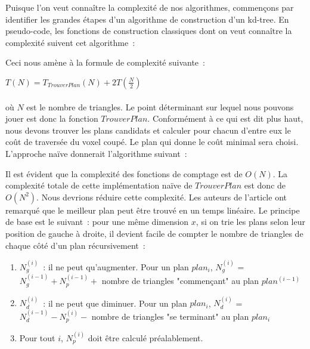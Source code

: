 \documentclass[a4paper]{article}
\begin{document}
Puisque l'on veut connaître la complexité de nos algorithmes, commençons par identifier les grandes étapes d'un algorithme de construction d'un kd-tree. En pseudo-code, les fonctions de construction classiques dont on veut connaître la complexité suivent cet algorithme~:
\begin{function}
\end{function}

Ceci nous amène à la formule de complexité suivante~:

$T(N) = T_{TrouverPlan}(N) + 2T(\frac{N}{2})$
\\\\
où $N$ est le nombre de triangles. Le point déterminant sur lequel nous pouvons jouer est donc la fonction $TrouverPlan$. Conformément à ce qui est dit plus haut, nous devons trouver les plans candidats et calculer pour chacun d'entre eux le coût de traversée du voxel coupé. Le plan qui donne le coût minimal sera choisi. L'approche naïve donnerait l'algorithme suivant~:

\begin{algorithm}
\end{algorithm}

Il est évident que la complexité des fonctions de comptage est de $O(N)$. La complexité totale de cette implémentation naïve de $TrouverPlan$ est donc de $O(N^2)$. Nous devrions réduire cette complexité. Les auteurs de l'article ont remarqué que le meilleur plan peut être trouvé en un temps linéaire. Le principe de base est le suivant~: pour une même dimension $x$, si on trie les plans selon leur position de gauche à droite, il devient facile de compter le nombre de triangles de chaque côté d'un plan récursivement~:
\begin{enumerate}
	\item $N_g^{(i)}$~: il ne peut qu'augmenter. Pour un plan $plan_i$, $N_g^{(i)}$ = $N_g^{(i-1)} + N_p^{(i-1)} + $ nombre de triangles "commençant" au plan $plan^{(i-1)}$
	\item $N_d^{(i)}$~: il ne peut que diminuer. Pour un plan $plan_i$, $N_d^{(i)}$ = $N_d^{(i-1)} - N_p^{(i)} - $ nombre de triangles "se terminant" au plan $plan_i$ 
	\item Pour tout $i$, $N_p^(i)$ doit \^etre calculé préalablement.
\end{enumerate}
\end{document}
